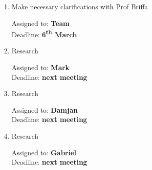\documentclass[11pt,a4paper]{scrartcl}
\begin{document}
\begin{enumerate}

\item Make necessary clarifications with Prof Briffa
\begin{flushright}
Assigned to: \textbf{Team} \\
Deadline: \textbf{6\textsuperscript{th} March}
\end{flushright}

\item Research
\begin{flushright}
Assigned to: \textbf{Mark} \\
Deadline: \textbf{next meeting}
\end{flushright}

\item Research
\begin{flushright}
Assigned to: \textbf{Damjan} \\
Deadline: \textbf{next meeting}
\end{flushright}

\item Research
\begin{flushright}
Assigned to: \textbf{Gabriel} \\
Deadline: \textbf{next meeting}
\end{flushright}


\end{enumerate}
\end{document}
